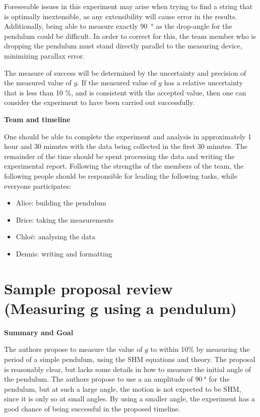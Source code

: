  Foreseeable issues in this experiment may arise when trying to find a string that is optimally inextensible, as any extensibility will cause error in the results. Additionally, being able to measure exactly \SI{90}{\degree} as the drop-angle for the pendulum could be difficult. In order to correct for this, the team member who is dropping the pendulum must stand directly parallel to the measuring device, minimizing parallax error. 

The measure of success will be determined by the uncertainty and precision of the measured value of $g$. If the measured value of $g$ has a relative uncertainty that is less than 10 \%, and is consistent with the accepted value, then one can consider the experiment to have been carried out successfully. 

\textbf{Team and timeline}

One should be able to complete the experiment and analysis in approximately 1 hour and 30 minutes with the data being collected in the first 30 minutes. The remainder of the time should be spent processing the data and writing the experimental report.  
Following the strengths of the members of the team, the following people should be responsible for leading the following tasks, while everyone participates:

\begin{itemize}
\item Alice: building the pendulum
\item Brice: taking the measurements
\item Chlo\"e: analysing the data
\item Dennis: writing and formatting
\end{itemize}


\newpage
\section{Sample proposal review (Measuring g using a pendulum)}
 \vspace{0.25cm}
\textbf{Summary and Goal}

The authors propose to measure the value of $g$ to within 10\% by measuring the period of a simple pendulum, using the SHM equations and theory. The proposal is reasonably clear, but lacks some details in how to measure the initial angle of the pendulum. The authors propose to use a an amplitude of $\SI{90}{\degree}$ for the pendulum, but at such a large angle, the motion is not expected to be SHM, since it is only so at small angles. By using a smaller angle, the experiment has a good chance of being successful in the proposed timeline.


